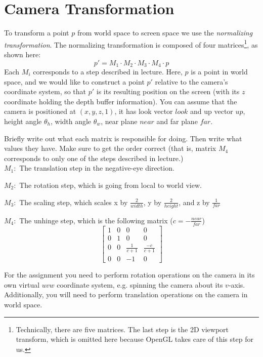 \documentclass[10pt,twocolumn]{article}
\begin{document}
\section{Camera Transformation}
To transform a point $p$ from world space to screen space we use the \emph{normalizing transformation}. The normalizing transformation is composed of four matrices\footnote{Technically, there are five matrices. The last step is the 2D viewport transform, which is omitted here because OpenGL takes care of this step for us.}, as shown here:
\[p' = M_1 \cdot M_2 \cdot M_3 \cdot M_4 \cdot p\]
Each $M_i$ corresponds to a step described in lecture. Here, $p$ is a point in world space, and we would like to construct a point $p'$ relative to the camera's coordinate system, so that $p'$ is its resulting position on the screen (with its $z$ coordinate holding the depth buffer information). You can assume that the camera is positioned at $(x,y,z,1)$, it has look vector $look$ and up vector $up$, height angle $\theta_h$, width angle $\theta_w$, near plane $near$ and far plane $far$.
\begin{framed}
\noindent {\bf [1/2 pt. each]} Briefly write out what each matrix is responsible for doing. Then write what values they have. Make sure to get the order correct (that is, matrix $M_4$ corresponds to only one of the steps described in lecture.)\\

$M_1:$
 The translation step in the negative-eye direction.
\vspace{1em}


$M_2:$
 The rotation step, which is going from local to world view.
\vspace{1em}


$M_3:$
 The scaling step, which scales x by $\frac{2}{width}$, y by $\frac{2}{height}$, and z by $\frac{1}{far}$
\vspace{1em}


$M_4:$
 The unhinge step, which is the following matrix ($c=-\frac{near}{far}$)
 $$
	\begin{bmatrix}
	1 & 0 & 0 & 0 \\
	0 & 1 & 0 & 0 \\
	0 & 0 & \frac{1}{c+1} & \frac{-c}{c+1} \\
	0 & 0 & -1 & 0
	\end{bmatrix}
 $$
\vspace{3em}

\end{framed}
\noindent For the assignment you need to perform rotation operations on the camera in its own virtual $uvw$ coordinate system, e.g. spinning the camera about its $v$-axis. Additionally, you will need to perform translation operations on the camera in world space.
\end{document}
